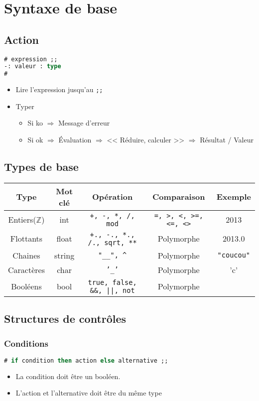 \chapter{Syntaxe de base}
\section{Action}
\begin{lstlisting}[language=Caml, caption=Syntaxe de base]
# expression ;;
-: valeur : type
#
\end{lstlisting}
\begin{itemize}
	\item Lire l'expression jusqu'au \texttt{;;}
	\item Typer
		\begin{itemize}
			\item Si ko $\Rightarrow$ Message d'erreur
			\item Si ok $\Rightarrow$ Évaluation $\Rightarrow$ << Réduire, calculer >> $\Rightarrow$ Résultat / Valeur
		\end{itemize}
\end{itemize}
\section{Types de base}
\begin{tabular}{c|c|c|c|c}
	\textbf{Type} & \textbf{Mot clé }& \textbf{Opération} & \textbf{Comparaison} & \textbf{Exemple} \\
	\hline
	Entiers($\mathbb Z$) & int & \texttt{+, -, *, /, mod}& \texttt{=, >, <, >=, <=, <>}&2013\\
	Flottants & float &\texttt{+., -., *., /., sqrt, **} &Polymorphe  &2013.0\\
	Chaines & string & \texttt{"\_\_", \^} & Polymorphe &\texttt{"coucou"}\\
	Caractères & char &\texttt{'\_'} &\texttt{}Polymorphe & 'c'\\
	Booléens & bool & \texttt{true, false, \&\&, ||, not}&\texttt{}Polymorphe &\\
\end{tabular}
\section{Structures de contrôles}
\subsection{Conditions}
\begin{lstlisting}[language=Caml, caption=Syntaxe de la condition]
# if condition then action else alternative ;;		
\end{lstlisting}
\begin{remarque}
	\begin{itemize}
		\item La condition doit être un booléen.
		\item L'action et l'alternative doit être du même type
	\end{itemize}
\end{remarque}
